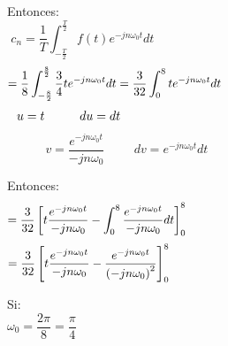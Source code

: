 \documentclass[a4paper]{article}
\begin{document}
{} Entonces:  
\[
c_{n}=\frac{1}{T}\int_{-\frac{T}{2}}^{\frac{T}{2}}f(t)e^{-jn\omega_{0}t}dt 
\hspace{10cm}
\]
\[
= \frac{1}{8}\int_{-\frac{8}{2}}^{\frac{8}{2}}\frac{3}{4}te^{-jn%
\omega_{0}t}dt=\frac{3}{32}\int_{0}^{8}te^{-jn\omega_{0}t}dt \hspace{6.8cm}
\]
\[
u=t \hspace{1cm} du=dt \hspace{9.2cm}
\]
\[
v=\frac{e^{-jn\omega_{0}t}}{-jn\omega_{0}} \hspace{1cm} dv=e^{-jn%
\omega_{0}t}dt \hspace{7cm}
\]

{} Entonces:  
\[
=\frac{3}{32}\left[t\frac{e^{-jn\omega_{0}t}}{-jn\omega_{0}}-\int_{0}^{8}%
\frac{e^{-jn\omega_{0}t}}{-jn\omega_{0}}dt\right]_{0}^{8} \hspace{7.8cm}
\]
\[
=\frac{3}{32}\left[t\frac{e^{-jn\omega_{0}t}}{-jn\omega_{0}}-\frac{%
e^{-jn\omega_{0}t}}{\left(-jn\omega_{0}\right)^{2}}\right]_{0}^{8} \hspace{%
8.3cm}
\]

{} Si:  
\[
\omega_{0}=\frac{2\pi}{8}=\frac{\pi}{4} \hspace{14cm}
\]
\clearpage{} {} {} 
\end{document}
